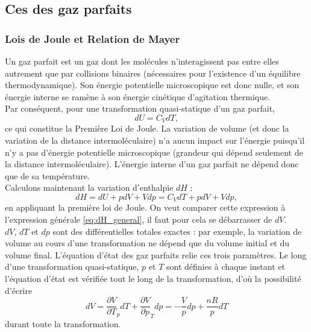 \documentclass[11pt,a4paper]{report}
\begin{document}
\subsection{Ces des gaz parfaits}

\subsubsection{Lois de Joule et Relation de Mayer}

Un gaz parfait est un gaz dont les molécules n'interagissent pas entre elles autrement que par collisions binaires (nécessaires pour l'existence d'un équilibre thermodynamique). Son énergie potentielle microscopique est donc nulle, et son énergie interne se ramène à son énergie cinétique d'agitation thermique.\\ 

Par conséquent, pour une transformation quasi-statique d'un gaz parfait,
\begin{equation}
	dU = C_V dT,
\end{equation}
ce qui constitue la Première Loi de Joule. La variation de volume (et donc la variation de la distance intermoléculaire) n'a aucun impact sur l'énergie puisqu'il n'y a pas d'énergie potentielle microscopique (grandeur qui dépend seulement de la distance intermoléculaire). L'énergie interne d'un gaz parfait ne dépend donc que de sa température.\\

Calculons maintenant la variation d'enthalpie $dH$ :
\begin{equation}
	dH = dU + pdV + Vdp = C_V dT + pdV + Vdp,
\end{equation}
en appliquant la première loi de Joule. On veut comparer cette expression à l'expression générale \eqref{eq:dH_general}, il faut pour cela se débarrasser de $dV$.\\

$dV$, $dT$ et $dp$ sont des différentielles totales exactes : par exemple, la variation de volume au cours d'une transformation ne dépend que du volume initial et du volume final. L'équation d'état des gaz parfaits relie ces trois paramètres. Le long d'une transformation quasi-statique, $p$ et $T$ sont définies à chaque instant et l'équation d'état est vérifiée tout le long de la transformation, d'où la possibilité d'écrire
\begin{equation}
	dV = \frac{\partial V}{\partial T}_p dT + \frac{\partial V}{\partial p}_T dp = -\frac{V}{p}dp + \frac{nR}{p}dT
\end{equation} 
durant toute la transformation.\\
\end{document}
